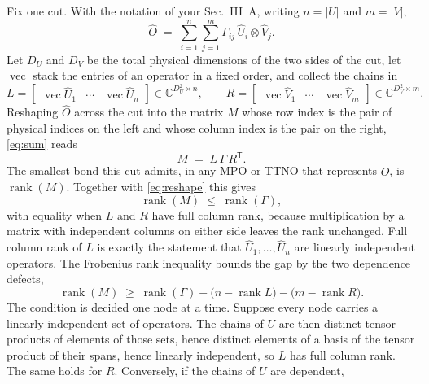 \documentclass[11pt,a4paper]{article}
\newcommand{\vectorise}{\operatorname{vec}}
\newcommand{\rank}{\operatorname{rank}}
\begin{document}
Fix one cut. With the notation of your Sec.~III~A, writing $n = |U|$ and $m = |V|$,
%
\begin{equation}\label{eq:sum}
  \hat{O} \;=\; \sum_{i=1}^{n}\sum_{j=1}^{m} \Gamma_{ij}\, \hat{U}_i \otimes \hat{V}_j .
\end{equation}
%
Let $D_U$ and $D_V$ be the total physical dimensions of the two sides of the cut, let
$\vectorise$ stack the entries of an operator in a fixed order, and collect the chains in
%
\begin{equation}\label{eq:lr}
  L = \begin{bmatrix} \vectorise \hat{U}_1 & \cdots & \vectorise \hat{U}_n \end{bmatrix}
      \in \mathbb{C}^{D_U^2 \times n},
  \qquad
  R = \begin{bmatrix} \vectorise \hat{V}_1 & \cdots & \vectorise \hat{V}_m \end{bmatrix}
      \in \mathbb{C}^{D_V^2 \times m}.
\end{equation}
%
Reshaping $\hat{O}$ across the cut into the matrix $M$ whose row index is the pair of physical
indices on the left and whose column index is the pair on the right, \cref{eq:sum} reads
%
\begin{equation}\label{eq:reshape}
  M \;=\; L\,\Gamma\,R^{\mathsf{T}}.
\end{equation}
%
The smallest bond this cut admits, in any MPO or TTNO that represents $\hat{O}$, is $\rank(M)$.
Together with \cref{eq:reshape} this gives
%
\begin{equation}\label{eq:bound}
  \rank(M) \;\le\; \rank(\Gamma),
\end{equation}
%
with equality when $L$ and $R$ have full column rank, because multiplication by a matrix with
independent columns on either side leaves the rank unchanged. Full column rank of $L$ is exactly the
statement that $\hat{U}_1,\dots,\hat{U}_n$ are linearly independent operators. The Frobenius rank
inequality bounds the gap by the two dependence defects,
%
\begin{equation}\label{eq:frobenius}
  \rank(M) \;\ge\; \rank(\Gamma) - \bigl(n - \rank L\bigr) - \bigl(m - \rank R\bigr).
\end{equation}
%
The condition is decided one node at a time. Suppose every node carries a linearly independent set
of operators. The chains of $U$ are then distinct tensor products of elements of those sets, hence
distinct elements of a basis of the tensor product of their spans, hence linearly independent, so
$L$ has full column rank. The same holds for $R$. Conversely, if the chains of $U$ are dependent,
\end{document}
